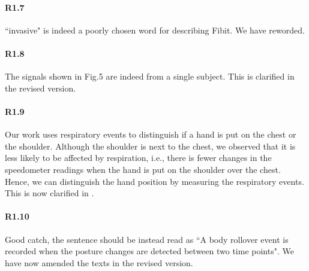 \paragraph{R1.7} ``invasive" is indeed a poorly chosen word for describing Fibit. We have reworded.
\vspace{-2mm}
\paragraph{R1.8} The signals shown in Fig.5 are indeed from a single subject. This is clarified in the revised version.
\vspace{-2mm}
\paragraph{R1.9} Our work uses respiratory events to distinguish if a hand is put on the chest or the shoulder. Although the shoulder is
next to the chest, we observed that it is less likely to be affected by respiration, i.e., there is fewer changes in the speedometer
readings when the hand is put on the shoulder over the chest. Hence, we can distinguish the hand position by measuring the respiratory
events. This is now clarified in .




\paragraph{R1.10} Good catch, the sentence should be instead read as ``A body rollover event is recorded when the posture changes are detected between
two time points". We have now amended the texts in the revised version.

